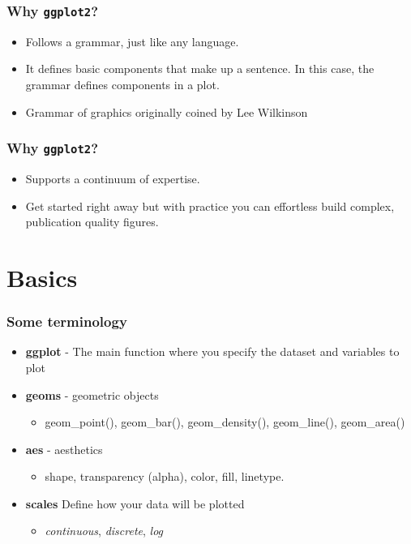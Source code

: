 \documentclass{beamer}\usepackage{graphicx, color}
\begin{document}
\begin{frame}[fragile]
\frametitle{Why \texttt{ggplot2}?}
\begin{itemize}
\item Follows a grammar, just like any language.
\item It defines basic components that make up a sentence. In this case, the grammar defines components in a plot.
\item Grammar of graphics originally coined by Lee Wilkinson
\end{itemize}
\end{frame}


\begin{frame}[fragile]
\frametitle{Why \texttt{ggplot2}?}
\begin{itemize}
\item  Supports a continuum of expertise.
\item Get started right away but with practice you can effortless build complex, publication quality figures.
\end{itemize}
\end{frame}

\section*{Basics}
\frame{\sectionpage}


\begin{frame}[fragile]
\frametitle{Some terminology}
\begin{itemize}
\item \textbf{ggplot} - The main function where you specify the dataset and variables to plot\\
\item \textbf{geoms} - geometric objects
    \begin{itemize}
    \item geom\_point(), geom\_bar(), geom\_density(), geom\_line(), geom\_area()
    \end{itemize}
\item \textbf{aes} -  aesthetics
        \begin{itemize}
    \item shape, transparency (alpha), color, fill, linetype.
    \end{itemize}
\item \textbf{scales}  Define how your data will be plotted
        \begin{itemize}
    \item \emph{continuous}, \emph{discrete}, \emph{log}
    \end{itemize}
\end{itemize}
\end{frame}
\end{document}

